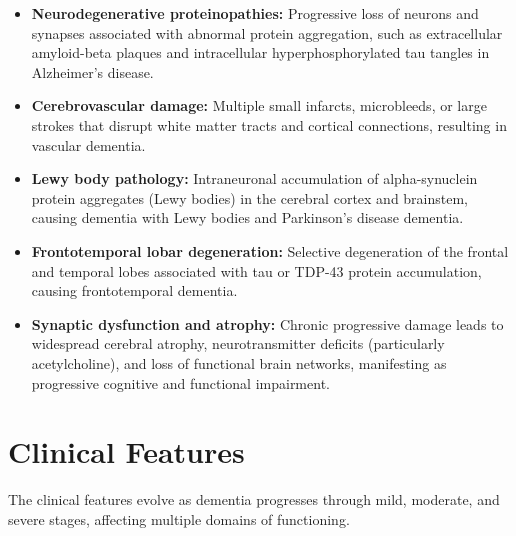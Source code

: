 \begin{itemize}
    \item \textbf{Neurodegenerative proteinopathies:} Progressive loss of neurons and synapses associated with abnormal protein aggregation, such as extracellular amyloid-beta plaques and intracellular hyperphosphorylated tau tangles in Alzheimer's disease.
    \item \textbf{Cerebrovascular damage:} Multiple small infarcts, microbleeds, or large strokes that disrupt white matter tracts and cortical connections, resulting in vascular dementia.
    \item \textbf{Lewy body pathology:} Intraneuronal accumulation of alpha-synuclein protein aggregates (Lewy bodies) in the cerebral cortex and brainstem, causing dementia with Lewy bodies and Parkinson's disease dementia.
    \item \textbf{Frontotemporal lobar degeneration:} Selective degeneration of the frontal and temporal lobes associated with tau or TDP-43 protein accumulation, causing frontotemporal dementia.
    \item \textbf{Synaptic dysfunction and atrophy:} Chronic progressive damage leads to widespread cerebral atrophy, neurotransmitter deficits (particularly acetylcholine), and loss of functional brain networks, manifesting as progressive cognitive and functional impairment.
\end{itemize}

\section*{Clinical Features}
The clinical features evolve as dementia progresses through mild, moderate, and severe stages, affecting multiple domains of functioning.


